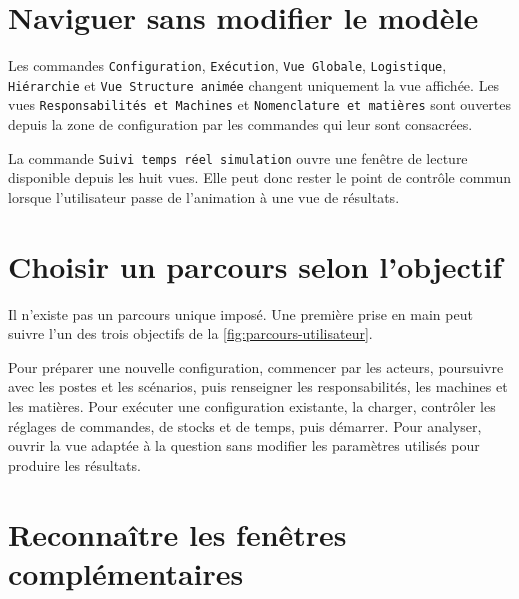 
\section{Naviguer sans modifier le modèle}

Les commandes \texttt{Configuration}, \texttt{Exécution}, \texttt{Vue Globale}, \texttt{Logistique}, \texttt{Hiérarchie} et \texttt{Vue Structure animée} changent uniquement la vue affichée. Les vues \texttt{Responsabilités et Machines} et \texttt{Nomenclature et matières} sont ouvertes depuis la zone de configuration par les commandes qui leur sont consacrées.

La commande \texttt{Suivi temps réel simulation} ouvre une fenêtre de lecture disponible depuis les huit vues. Elle peut donc rester le point de contrôle commun lorsque l'utilisateur passe de l'animation à une vue de résultats.


\section{Choisir un parcours selon l'objectif}

Il n'existe pas un parcours unique imposé. Une première prise en main peut suivre l'un des trois objectifs de la \cref{fig:parcours-utilisateur}.


Pour préparer une nouvelle configuration, commencer par les acteurs, poursuivre avec les postes et les scénarios, puis renseigner les responsabilités, les machines et les matières. Pour exécuter une configuration existante, la charger, contrôler les réglages de commandes, de stocks et de temps, puis démarrer. Pour analyser, ouvrir la vue adaptée à la question sans modifier les paramètres utilisés pour produire les résultats.

\section{Reconnaître les fenêtres complémentaires}

